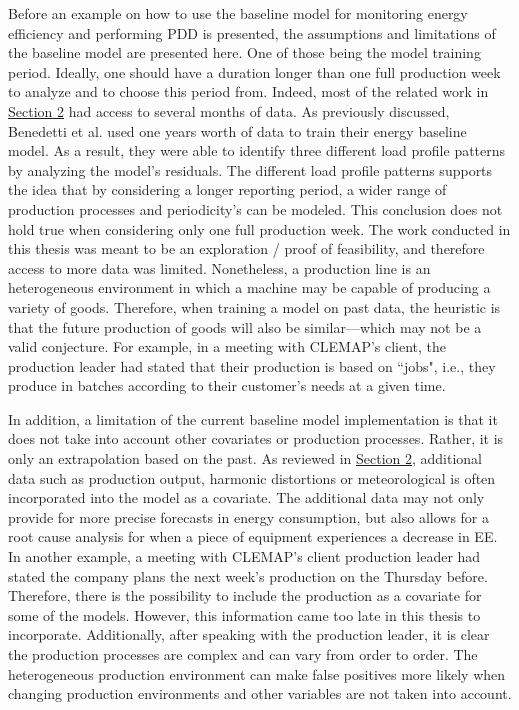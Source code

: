 Before an example on how to use the baseline model for monitoring energy efficiency and performing PDD is presented, the assumptions and limitations of the baseline model are presented here. One of those being the model training period. Ideally, one should have a duration longer than one full production week to analyze and to choose this period from. Indeed, most of the related work in \hyperlink{section.2}{Section 2} had access to several months of data. As previously discussed, Benedetti et al. \cite{cas} used one years worth of data to train their energy baseline model. As a result, they were able to identify three different load profile patterns by analyzing the model's residuals. The different load profile patterns supports the idea that by considering a longer reporting period, a wider range of production processes and periodicity's can be modeled. This conclusion does not hold true when considering only one full production week. The work conducted in this thesis was meant to be an exploration / proof of feasibility, and therefore access to more data was limited. Nonetheless, a production line is an heterogeneous environment in which a machine may be capable of producing a variety of goods. Therefore, when training a model on past data, the heuristic is that the future production of goods will also be similar—which may not be a valid conjecture. For example, in a meeting with CLEMAP's client, the production leader had stated that their production is based on ``jobs", i.e., they produce in batches according to their customer's needs at a given time.

In addition, a limitation of the current baseline model implementation is that it does not take into account other covariates or production processes. Rather, it is only an extrapolation based on the past. As reviewed in \hyperlink{section.2}{Section 2}, additional data such as production output, harmonic distortions or meteorological is often incorporated into the model as a covariate. The additional data may not only provide for more precise forecasts in energy consumption, but also allows for a root cause analysis for when a piece of equipment experiences a decrease in EE. In another example, a meeting with CLEMAP's client production leader had stated the company plans the next week's production on the Thursday before. Therefore, there is the possibility to include the production as a covariate for some of the models. However, this information came too late in this thesis to incorporate. Additionally, after speaking with the production leader, it is clear the production processes are complex and can vary from order to order. The heterogeneous production environment can make false positives more likely when changing production environments and other variables are not taken into account.

